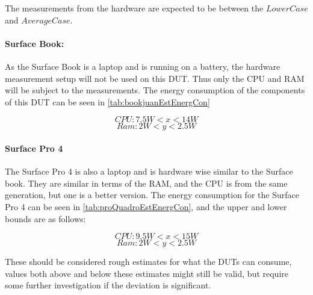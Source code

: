 The measurements from the hardware are expected to be between the $LowerCase$ and $AverageCase$.

\paragraph{Surface Book:} As the Surface Book is a laptop and is running on a battery, the hardware measurement setup will not be used on this DUT. Thus only the CPU and RAM will be subject to the measurements. The energy consumption of the components of this DUT can be seen in \cref*{tab:bookjuanEstEnergCon}

$$CPU: 7.5W < x < 14W $$
$$Ram: 2W < y < 2.5W $$



\paragraph{Surface Pro 4} The Surface Pro 4 is also a laptop and is hardware wise similar to the Surface book. They are similar in terms of the RAM, and the CPU is from the same generation, but one is a better version. The energy consumption for the Surface Pro 4 can be seen in \cref{tab:proQuadroEstEnergCon}, and the upper and lower bounds are as follows:

$$CPU: 9.5W < x < 15W $$
$$Ram: 2W < y < 2.5W $$



These should be considered rough estimates for what the DUTs can consume, values both above and below these estimates might still be valid, but require some further investigation if the deviation is significant.